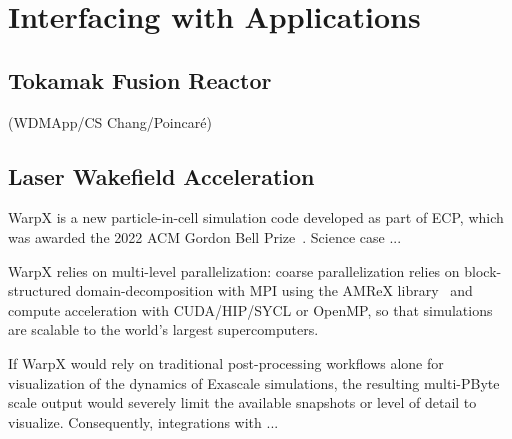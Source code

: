 \section{Interfacing with Applications}


\subsection{Tokamak Fusion Reactor}


(WDMApp/CS Chang/Poincar\'{e})

\subsection{Laser Wakefield Acceleration}



WarpX is a new particle-in-cell simulation code developed as part of ECP, which was awarded the 2022 ACM Gordon Bell Prize~\cite{FedeliHuebl2022}.
Science case ...

WarpX relies on multi-level parallelization: coarse parallelization relies on block-structured domain-decomposition with MPI using the AMReX library~\cite{Zhang2019} and compute acceleration with CUDA/HIP/SYCL or OpenMP, so that simulations are scalable to the world's largest supercomputers.

If WarpX would rely on traditional post-processing workflows alone for visualization of the dynamics of Exascale simulations, the resulting multi-PByte scale output would severely limit the available snapshots or level of detail to visualize.
Consequently, integrations with ...

